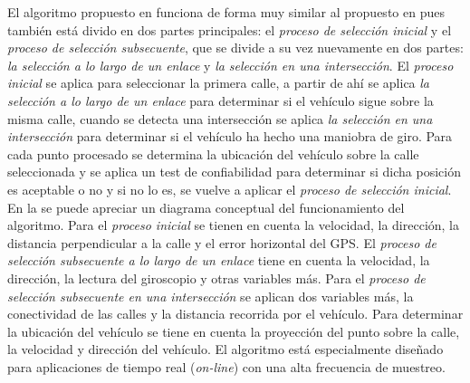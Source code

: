 El algoritmo propuesto en \citep{quddus2006high} funciona de forma muy similar al propuesto en \citep{ochieng2009map} pues también está divido en dos partes principales: el \emph{proceso de selección inicial} y el \emph{proceso de selección subsecuente}, que se divide a su vez nuevamente en dos partes: \emph{la selección a lo largo de un enlace} y  \emph{la selección en una intersección}. El \emph{proceso inicial} se aplica para seleccionar la primera calle, a partir de ahí se aplica \emph{la selección a lo largo de un enlace} para determinar si el vehículo sigue sobre la misma calle, cuando se detecta una intersección se aplica \emph{la selección en una intersección} para determinar si el vehículo ha hecho una maniobra de giro. Para cada punto procesado se determina la ubicación del vehículo sobre la calle seleccionada y se aplica un test de confiabilidad para determinar si dicha posición es aceptable o no y si no lo es, se vuelve a aplicar el \emph{proceso de selección inicial}. En la  se puede apreciar un diagrama conceptual del funcionamiento del algoritmo. Para el \emph{proceso inicial} se tienen en cuenta la velocidad, la dirección, la distancia perpendicular a la calle y el error horizontal del GPS. El \emph{proceso de selección subsecuente a lo largo de un enlace} tiene en cuenta la velocidad, la dirección, la lectura del giroscopio y otras variables más. Para el \emph{proceso de selección subsecuente en una intersección} se aplican dos variables más, la conectividad de las calles y la distancia recorrida por el vehículo. Para determinar la ubicación del vehículo se tiene en cuenta la proyección del punto sobre la calle, la velocidad y dirección del vehículo. El algoritmo está especialmente diseñado para aplicaciones de tiempo real (\emph{on-line}) con una alta frecuencia de muestreo. 

